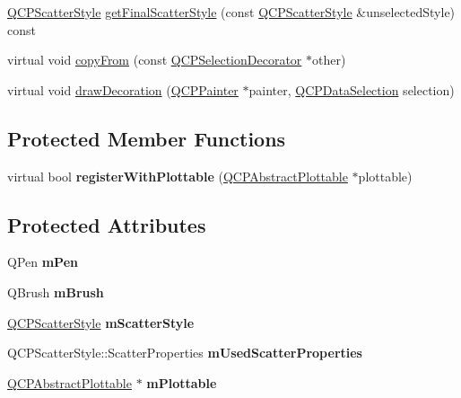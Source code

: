 \begin{DoxyCompactItemize}
\item 
\hyperlink{classQCPScatterStyle}{Q\+C\+P\+Scatter\+Style} \hyperlink{classQCPSelectionDecorator_a1277b373248896bc70e8cc1de96da9fa}{get\+Final\+Scatter\+Style} (const \hyperlink{classQCPScatterStyle}{Q\+C\+P\+Scatter\+Style} \&unselected\+Style) const
\item 
virtual void \hyperlink{classQCPSelectionDecorator_a467a8d5cfcab27e862a17c797ac27b8a}{copy\+From} (const \hyperlink{classQCPSelectionDecorator}{Q\+C\+P\+Selection\+Decorator} $\ast$other)
\item 
virtual void \hyperlink{classQCPSelectionDecorator_a4f8eb49e277063845391e803ae23054a}{draw\+Decoration} (\hyperlink{classQCPPainter}{Q\+C\+P\+Painter} $\ast$painter, \hyperlink{classQCPDataSelection}{Q\+C\+P\+Data\+Selection} selection)
\end{DoxyCompactItemize}
\subsection*{Protected Member Functions}
\begin{DoxyCompactItemize}
\item 
\mbox{\label{classQCPSelectionDecorator_af66cb39e308da0285ae5d533e1e85027}} 
virtual bool {\bfseries register\+With\+Plottable} (\hyperlink{classQCPAbstractPlottable}{Q\+C\+P\+Abstract\+Plottable} $\ast$plottable)
\end{DoxyCompactItemize}
\subsection*{Protected Attributes}
\begin{DoxyCompactItemize}
\item 
\mbox{\label{classQCPSelectionDecorator_a684a691c146a5bac927c0146bd28d557}} 
Q\+Pen {\bfseries m\+Pen}
\item 
\mbox{\label{classQCPSelectionDecorator_a4e3a3a01fdec5b018c0c59a0b6ae9f70}} 
Q\+Brush {\bfseries m\+Brush}
\item 
\mbox{\label{classQCPSelectionDecorator_a5b822197a1bf802c5cf8c3dc43ca549a}} 
\hyperlink{classQCPScatterStyle}{Q\+C\+P\+Scatter\+Style} {\bfseries m\+Scatter\+Style}
\item 
\mbox{\label{classQCPSelectionDecorator_acb4f6af085283c9ce7d5c168fb53e855}} 
Q\+C\+P\+Scatter\+Style\+::\+Scatter\+Properties {\bfseries m\+Used\+Scatter\+Properties}
\item 
\mbox{\label{classQCPSelectionDecorator_a25250a1d29b0723c4fa59a97e62f5758}} 
\hyperlink{classQCPAbstractPlottable}{Q\+C\+P\+Abstract\+Plottable} $\ast$ {\bfseries m\+Plottable}
\end{DoxyCompactItemize}

